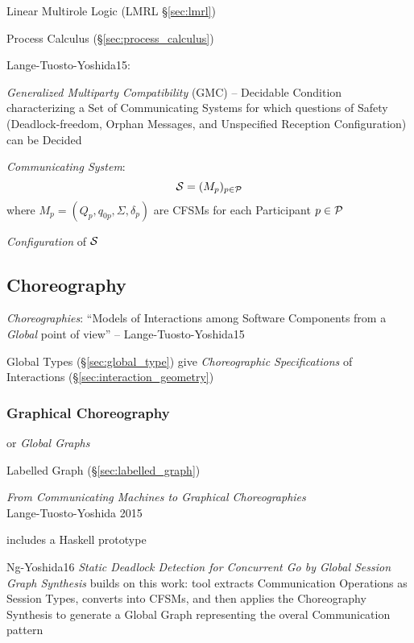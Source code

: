 Linear Multirole Logic (LMRL \S\ref{sec:lmrl})

\fist Process Calculus (\S\ref{sec:process_calculus})

Lange-Tuosto-Yoshida15:

\emph{Generalized Multiparty Compatibility} (GMC) -- Decidable
Condition characterizing a Set of Communicating Systems for which
questions of Safety (Deadlock-freedom, Orphan Messages, and
Unspecified Reception Configuration) can be Decided

\emph{Communicating System}:
\[
  \mathcal{S} = (M_p)_{p \in \mathcal{P}}
\]
where $M_p = (Q_p, q_{0p}, \Sigma, \delta_p)$ are CFSMs for each
Participant $p \in \mathcal{P}$

\emph{Configuration} of $\mathcal{S}$ %



\subsection{Choreography}\label{sec:choreography}

\emph{Choreographies}: ``Models of Interactions among Software
Components from a \emph{Global} point of view'' --
Lange-Tuosto-Yoshida15

\fist Global Types (\S\ref{sec:global_type}) give \emph{Choreographic
  Specifications} of Interactions (\S\ref{sec:interaction_geometry})



\subsubsection{Graphical Choreography}\label{sec:graphical_choreography}

or \emph{Global Graphs}

\fist Labelled Graph (\S\ref{sec:labelled_graph})

\begingroup

\newcommand{\party}{\mono}

\emph{From Communicating Machines to Graphical Choreographies} \\
Lange-Tuosto-Yoshida 2015

includes a Haskell prototype

Ng-Yoshida16 \emph{Static Deadlock Detection for Concurrent Go by
  Global Session Graph Synthesis} builds on this work: tool extracts
Communication Operations as Session Types, converts into CFSMs, and
then applies the Choreography Synthesis to generate a Global Graph
representing the overal Communication pattern

